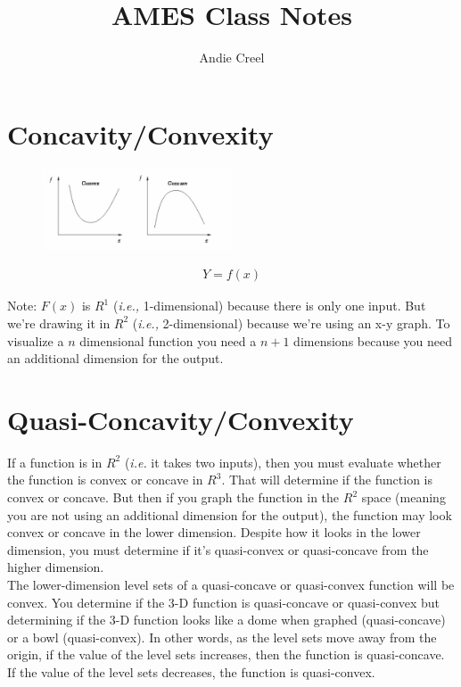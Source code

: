 \documentclass{article}
\title{AMES Class Notes}
\author{Andie Creel}
\begin{document}
\maketitle

\section{Concavity/Convexity}
\begin{figure}[htp]
    \centering
        \includegraphics[width=0.5\textwidth]{Screen Shot 2023-09-18 at 10.38.18 AM.png}
\end{figure}

\begin{align*}
    Y = f(x) 
\end{align*}

Note: $F(x)$ is $R^1$ (\textit{i.e.,} 1-dimensional) because there is only one input. But we're drawing it in $R^2$ (\textit{i.e.,} 2-dimensional) because we're using an x-y graph. To visualize a $n$ dimensional function you need a $n+1$ dimensions because you need an additional dimension for the output.

\section{Quasi-Concavity/Convexity}

If a function is in $R^2$ (\textit{i.e.} it takes two inputs), then you must evaluate whether the function is convex or concave in $R^3$. That will determine if the function is convex or concave. But then if you graph the function in the $R^2$ space (meaning you are not using an additional dimension for the output), the function may look convex or concave in the lower dimension. Despite how it looks in the lower dimension, you must determine if it's quasi-convex or quasi-concave from the higher dimension.  \\

The lower-dimension level sets of a quasi-concave or quasi-convex function will be convex. You determine if the 3-D function is quasi-concave or quasi-convex but determining if the 3-D function looks like a dome when graphed (quasi-concave) or a bowl (quasi-convex). In other words, as the level sets move away from the origin, if the value of the level sets increases, then the function is quasi-concave. If the value of the level sets decreases, the function is quasi-convex. 
\end{document}
